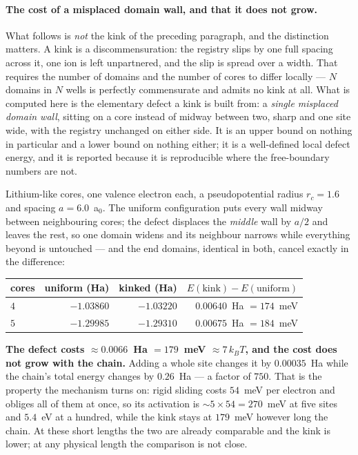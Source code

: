\documentclass[11pt]{article}
\begin{document}
\paragraph{The cost of a misplaced domain wall, and that it does not grow.} What follows is
\emph{not} the kink of the preceding paragraph, and the distinction matters. A kink is a
discommensuration: the registry slips by one full spacing across it, one ion is left unpartnered,
and the slip is spread over a width. That requires the number of domains and the number of cores to
differ locally --- $N$ domains in $N$ wells is perfectly commensurate and admits no kink at all.
What is computed here is the elementary defect a kink is built from: a \emph{single misplaced domain
wall}, sitting on a core instead of midway between two, sharp and one site wide, with the registry
unchanged on either side. It is an upper bound on nothing in particular and a lower bound on
nothing either; it is a well-defined local defect energy, and it is reported because it is
reproducible where the free-boundary numbers are not.

Lithium-like cores, one valence electron each, a pseudopotential radius $r_c=1.6$ and spacing
$a=6.0$~a$_0$. The uniform configuration puts every wall midway between neighbouring cores; the
defect displaces the \emph{middle} wall by $a/2$ and leaves the rest, so one domain widens and its
neighbour narrows while everything beyond is untouched --- and the end domains, identical in both,
cancel exactly in the difference:

\begin{center}
\small
\begin{tabular}{@{}lrrr@{}}
\toprule
cores & uniform (Ha) & kinked (Ha) & $E(\mathrm{kink})-E(\mathrm{uniform})$\\
\midrule
$4$ & $-1.03860$ & $-1.03220$ & $0.00640$~Ha $=174$~meV\\
$5$ & $-1.29985$ & $-1.29310$ & $0.00675$~Ha $=184$~meV\\
\bottomrule
\end{tabular}
\end{center}

\noindent \textbf{The defect costs $\approx0.0066$~Ha $=179$~meV $\approx7\,k_BT$, and the cost
does not grow with the chain.} Adding a whole site changes it by $0.00035$~Ha while the chain's total
energy changes by $0.26$~Ha --- a factor of $750$. That is the property the mechanism turns on:
rigid sliding costs $54$~meV per electron and obliges all of them at once, so its activation is
$\sim5\times54=270$~meV at five sites and $5.4$~eV at a hundred, while the kink stays at $179$~meV
however long the chain. At these short lengths the two are already comparable and the kink is
lower; at any physical length the comparison is not close.
\end{document}
